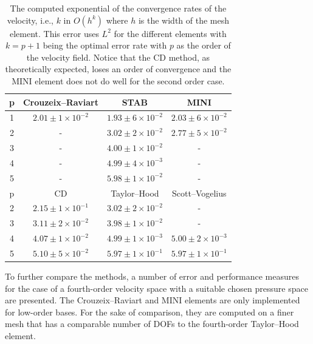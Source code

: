 \begin{table}
  \caption{The computed exponential of the convergence rates of the
  velocity, i.e., $k$ in $O(h^k)$ where $h$ is the width of the mesh
  element. This error uses $L^2$ for the different elements with $k=p+1$
  being the optimal error rate with $p$ as the order of the velocity
  field.  Notice that the CD method, as theoretically expected, loses
  an order of convergence and the MINI element does not do well for the
  second order case. }
  \label{tab:terrel:vel_error}
  \begin{center}
  \small
  \begin{tabular}{|c|ccc|}
    \hline
    p  & Crouzeix--Raviart &  STAB &  MINI \\
\hline
   1 & $2.01\pm 1 \times 10^{-2}$ & $1.93\pm 6 \times 10^{-2}$ & $2.03\pm 6 \times 10^{-2}$ \\
   2 & -                          & $3.02\pm 2 \times 10^{-2}$ & $2.77\pm 5 \times 10^{-2}$ \\
   3 & -                          & $4.00\pm 1 \times 10^{-2}$ & - \\
   4 & -                          & $4.99\pm 4 \times 10^{-3}$ & - \\
   5 & -                          & $5.98\pm 1 \times 10^{-2}$ & -\\
    \hline
    \hline
    p  &  CD  & Taylor--Hood & Scott--Vogelius \\
\hline
   2 & $2.15 \pm 1 \times 10^{-1}$ & $3.02 \pm 2 \times 10^{-2}$ & -  \\
   3 & $3.11 \pm 2 \times 10^{-2}$ & $3.98 \pm 1 \times 10^{-2}$ & -  \\
   4 & $4.07 \pm 1 \times 10^{-2}$ & $4.99 \pm 1 \times 10^{-3}$ & $5.00 \pm 2 \times 10^{-3}$\\
   5 & $5.10 \pm 5 \times 10^{-2}$ & $5.97 \pm 1 \times 10^{-1}$ & $5.97 \pm 1 \times 10^{-1}$\\
    \hline
   \end{tabular}
  \end{center}
\end{table}

To further compare the methods, a number of error and performance measures
for the case of a fourth-order velocity space with a suitable chosen
pressure space are presented. The Crouzeix--Raviart and MINI elements
are only implemented for low-order bases. For the sake of comparison,
they are computed on a finer mesh that has a comparable number of DOFs to
the fourth-order Taylor--Hood element.

